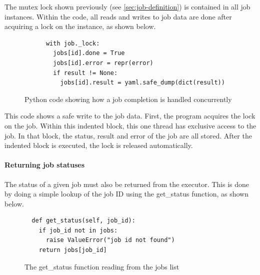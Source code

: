 \documentclass[12pt, letterpaper]{article}
\begin{document}
\begin{flushleft}
The mutex lock shown previously (see \ref{sec:job-definition}) is contained in all job instances. Within the code, all reads and writes to job data are done after acquiring a lock on the instance, as shown below.
\end{flushleft}

\begin{flushleft}
\begin{figure}[H]
\begin{verbatim}
      with job._lock:
        jobs[id].done = True
        jobs[id].error = repr(error)
        if result != None:
          jobs[id].result = yaml.safe_dump(dict(result))
\end{verbatim}
\caption{Python code showing how a job completion is handled concurrently}
\end{figure}
\end{flushleft}

\begin{flushleft}
This code shows a safe write to the job data. First, the program acquires the lock on the job. Within this indented block, this one thread has exclusive access to the job. In that block, the status, result and error of the job are all stored. After the indented block is executed, the lock is released automatically.
\end{flushleft}

\paragraph{Returning job statuses}

\begin{flushleft}
The status of a given job must also be returned from the executor. This is done by doing a simple lookup of the job ID using the get\_status function, as shown below.
\end{flushleft}

\begin{flushleft}
\begin{figure}[H]
\begin{verbatim}
  def get_status(self, job_id):
    if job_id not in jobs:
      raise ValueError("job id not found")
    return jobs[job_id]
\end{verbatim}
\caption{The get\_status function reading from the jobs list}
\end{figure}
\end{flushleft}
\end{document}
